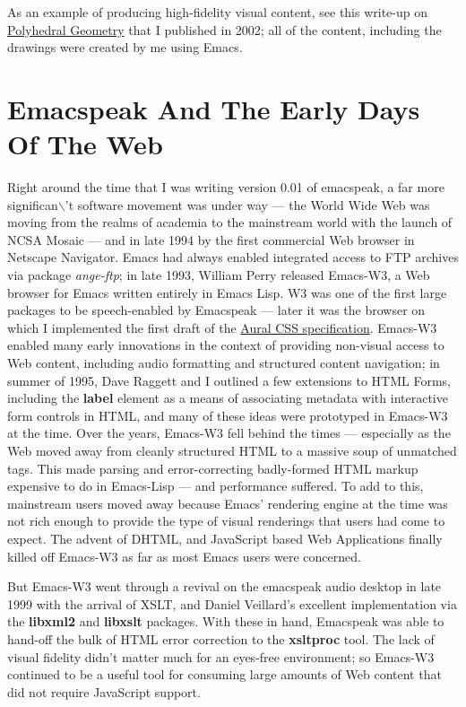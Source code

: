 \documentclass[11pt]{article}
\begin{document}
As an example of producing high-fidelity visual content, see this
write-up on
\href{http://emacspeak.sourceforge.net/raman/publications/polyhedra/}{Polyhedral
Geometry} that I published in 2002; all of the content,
including the drawings were created by me using Emacs.

\section{Emacspeak And The Early Days Of The Web}
\label{sec:orgdd0b2c5}

Right around the time that I was writing version 0.01 of
emacspeak, a far more significan$\backslash$'t software movement was under way
— the World Wide Web was moving from the realms of academia to
the mainstream world with the launch of NCSA Mosaic — and in late
1994 by the first commercial Web browser in Netscape
Navigator. Emacs had always enabled integrated access to FTP
archives via package \emph{ange-ftp}; in late 1993, William Perry
released Emacs-W3, a Web browser for Emacs written entirely in
Emacs Lisp. W3 was one of the first large packages to be
speech-enabled by Emacspeak — later it was the browser on which I
implemented the first draft of the
\href{http://www.w3.org/TR/CSS2/aural.html}{Aural CSS
specification}. Emacs-W3 enabled many early innovations in the
context of providing non-visual access to Web content, including
audio formatting and structured content navigation; in summer of
1995, Dave Raggett and I outlined a few extensions to HTML Forms,
including the \textbf{label} element as a means of associating metadata
with interactive form controls in HTML, and many of these ideas
were prototyped in Emacs-W3 at the time. Over the years, Emacs-W3
fell behind the times — especially as the Web moved away from
cleanly structured HTML to a massive soup of unmatched tags. This
made parsing and error-correcting badly-formed HTML markup
expensive to do in Emacs-Lisp — and performance suffered. To add
to this, mainstream users moved away because Emacs' rendering
engine at the time was not rich enough to provide the type of
visual renderings that users had come to expect. The advent of
DHTML, and JavaScript based Web Applications finally killed off
Emacs-W3 as far as most Emacs users were concerned.

But Emacs-W3 went through a revival on the emacspeak audio
desktop in late 1999 with the arrival of XSLT, and Daniel
Veillard's excellent implementation via the \textbf{libxml2} and
\textbf{libxslt} packages. With these in hand, Emacspeak was able to
hand-off the bulk of HTML error correction to the \textbf{xsltproc}
tool. The lack of visual fidelity didn't matter much for an
eyes-free environment; so Emacs-W3 continued to be a useful tool
for consuming large amounts of Web content that did not require
JavaScript support.
\end{document}
